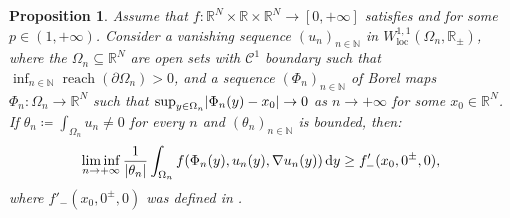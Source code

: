 \documentclass[10pt]{amsart}
\theoremstyle{plain}
\newtheorem{proposition}[theorem]{Proposition}
\theoremstyle{definition}
\newcommand{\dd}{\mathop{}\mathopen{}\mathrm{d}}
\newcommand{\N}{\mathbb{N}}
\newcommand{\R}{\mathbb{R}}
\newcommand{\Cspace}{\mathscr{C}}
\newcommand{\loc}{\mathrm{loc}}
\DeclarePairedDelimiter{\abs}{\lvert}{\rvert}
\DeclareMathOperator{\reach}{reach}
\begin{document}
\begin{proposition}\label{vanishingCost}
Assume that \(f:\R^N\times\R\times\R^N\to[0,+\infty]\) satisfies  and  for some \(p\in(1,+\infty)\). Consider a vanishing sequence $(u_n)_{n\in \N}$ in \(W^{1,1}_\loc(\Omega_n,\R_\pm)\), where the $\Omega_n\subseteq\R^N$ are open sets with \(\Cspace^1\) boundary such that \(\inf_{n\in\N}\reach(\partial\Omega_n)>0\), and a sequence $(\Phi_n)_{n\in\N}$ of Borel maps \(\Phi_n:\Omega_n\to\R^N\) such that $ \sup_{y\in\Omega_n}\abs{\Phi_n(y)-x_0} \to 0$ as \(n\to+\infty\) for some \(x_0\in\R^N\). If $\theta_n \coloneqq \int_{\Omega_n} u_n \neq 0$ for every $n$ and $(\theta_n)_{n\in\N}$ is bounded, then:
\[\liminf_{n\to+\infty} \frac 1{\abs{\theta_n}} \int_{\Omega_n} f(\Phi_n(y), u_n(y),\nabla u_n(y)) \dd y \geq f'_-(x_0,0^\pm,0),\]
where \(f'_-(x_0,0^\pm,0)\) was defined in .
\end{proposition}
\end{document}
